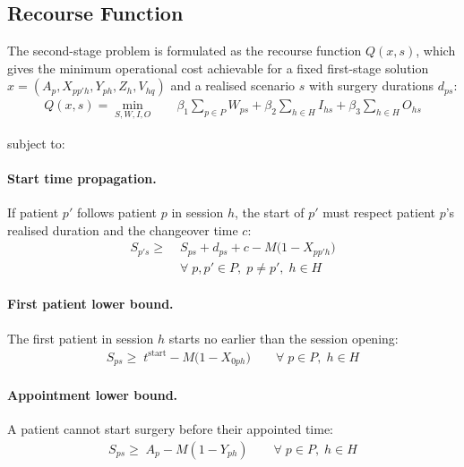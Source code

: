  
\subsection{Recourse Function}
 
The second-stage problem is formulated as the recourse function $Q(x, s)$,
which gives the minimum operational cost achievable for a fixed first-stage
solution $x = (A_p, X_{pp'h}, Y_{ph}, Z_h, V_{hq})$ and a realised scenario
$s$ with surgery durations $d_{ps}$:
%
\begin{align}
  Q(x, s) = \min_{S,W,I,O} \quad
    & \beta_1 \sum_{p \in P} W_{ps}
    + \beta_2 \sum_{h \in H} I_{hs}
    + \beta_3 \sum_{h \in H} O_{hs}
  \label{eq:recourse_obj}
\end{align}
 
\noindent subject to:
 
\paragraph{Start time propagation.}
If patient $p'$ follows patient $p$ in session $h$, the start of $p'$ must
respect patient $p$'s realised duration and the changeover time $c$:
%
\begin{align}
  S_{p's} \geq\; & S_{ps} + d_{ps} + c - M\bigl(1 - X_{pp'h}\bigr)
  \nonumber \\
                 & \forall\; p, p' \in P,\; p \neq p',\; h \in H
  \label{eq:rc_seq}
\end{align}
 
\paragraph{First patient lower bound.}
The first patient in session $h$ starts no earlier than the session opening:
%
\begin{align}
  S_{ps} \geq\; t^{\text{start}} - M\bigl(1 - X_{0ph}\bigr)
  \qquad \forall\; p \in P,\; h \in H
  \label{eq:rc_first}
\end{align}
 
\paragraph{Appointment lower bound.}
A patient cannot start surgery before their appointed time:
%
\begin{align}
  S_{ps} \geq\; A_p - M(1 - Y_{ph})
  \qquad \forall\; p \in P,\; h \in H
  \label{eq:rc_appt}
\end{align}
 
